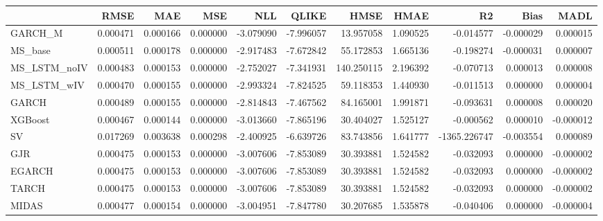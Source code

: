 \begin{tabular}{lrrrrrrrrrr}
\toprule
 & RMSE & MAE & MSE & NLL & QLIKE & HMSE & HMAE & R2 & Bias & MADL \\
\midrule
GARCH_M & 0.000471 & 0.000166 & 0.000000 & -3.079090 & -7.996057 & 13.957058 & 1.090525 & -0.014577 & -0.000029 & 0.000015 \\
MS_base & 0.000511 & 0.000178 & 0.000000 & -2.917483 & -7.672842 & 55.172853 & 1.665136 & -0.198274 & -0.000031 & 0.000007 \\
MS_LSTM_noIV & 0.000483 & 0.000153 & 0.000000 & -2.752027 & -7.341931 & 140.250115 & 2.196392 & -0.070713 & 0.000013 & 0.000008 \\
MS_LSTM_wIV & 0.000470 & 0.000155 & 0.000000 & -2.993324 & -7.824525 & 59.118353 & 1.440930 & -0.011513 & 0.000000 & 0.000004 \\
GARCH & 0.000489 & 0.000155 & 0.000000 & -2.814843 & -7.467562 & 84.165001 & 1.991871 & -0.093631 & 0.000008 & 0.000020 \\
XGBoost & 0.000467 & 0.000144 & 0.000000 & -3.013660 & -7.865196 & 30.404027 & 1.525127 & -0.000562 & 0.000010 & -0.000012 \\
SV & 0.017269 & 0.003638 & 0.000298 & -2.400925 & -6.639726 & 83.743856 & 1.641777 & -1365.226747 & -0.003554 & 0.000089 \\
GJR & 0.000475 & 0.000153 & 0.000000 & -3.007606 & -7.853089 & 30.393881 & 1.524582 & -0.032093 & 0.000000 & -0.000002 \\
EGARCH & 0.000475 & 0.000153 & 0.000000 & -3.007606 & -7.853089 & 30.393881 & 1.524582 & -0.032093 & 0.000000 & -0.000002 \\
TARCH & 0.000475 & 0.000153 & 0.000000 & -3.007606 & -7.853089 & 30.393881 & 1.524582 & -0.032093 & 0.000000 & -0.000002 \\
MIDAS & 0.000477 & 0.000154 & 0.000000 & -3.004951 & -7.847780 & 30.207685 & 1.535878 & -0.040406 & 0.000000 & -0.000004 \\
\bottomrule
\end{tabular}
